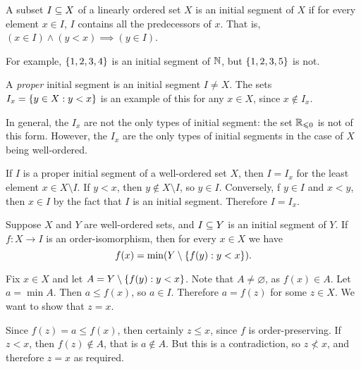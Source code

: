 \documentclass{article}
\begin{document}
\begin{definition}
	\label{definition-initial-segment}
    A subset $I \subseteq X$ of a linearly ordered set $X$ is an initial segment of $X$ if for every element $x \in I$, $I$ contains all the predecessors of $x$. That is, $(x \in I) \land (y < x) \implies (y \in I)$.
    
    For example, $\left\lbrace 1, 2, 3, 4 \right\rbrace$ is an initial segment of $\mathbb{N}$, but $\left\lbrace 1, 2, 3, 5 \right\rbrace$ is not.
    
    A \textit{proper} initial segment is an initial segment $I \neq X$. The sets $I_x = \left\lbrace y \in X: y < x \right\rbrace$ is an example of this for any $x \in X$, since $x \notin I_x$.
\end{definition}

\begin{corollary}
    In general, the $I_x$ are not the only types of initial segment: the set $\mathbb{R}_{\leqslant 0}$ is not of this form. However, the $I_x$ are the only types of initial segments in the case of $X$ being well-ordered.
\end{corollary}

\begin{prf}
    If $I$ is a proper initial segment of a well-ordered set $X$, then $I = I_x$ for the least element $x \in X \setminus I$. If $y < x$, then $y \notin X \setminus I$, so $y \in I$. Conversely, f $y \in I$ and $x < y$, then $x \in I$ by the fact that $I$ is an initial segment. Therefore $I = I_x$.
\end{prf}

\begin{proposition}
	\label{order-isomorphism-restriction}
    Suppose $X$ and $Y$ are well-ordered sets, and $I \subseteq Y$ is an initial segment of $Y$. If $f: X \to I$ is an order-isomorphism, then for every $x \in X$ we have
    \[
	f(x) = \min (Y \setminus \left\lbrace f(y) : y < x \right\rbrace).
	\]
\end{proposition}

\begin{prf}
    Fix $x \in X$ and let $A = Y \setminus \left\lbrace f(y) : y < x \right\rbrace$. Note that $A \neq \varnothing$, as $f(x) \in A$. Let $a = \min A$. Then $a \leq f(x)$, so $a \in I$. Therefore $a = f(z)$ for some $z \in X$. We want to show that $z = x$.
    
    Since $f(z) = a \leq f(x)$, then certainly $z \leq x$, since $f$ is order-preserving. If $z < x$, then $f(z) \notin A$, that is $a \notin A$. But this is a contradiction, so $z \not< x$, and therefore $z = x$ as required.
\end{prf}
\end{document}
